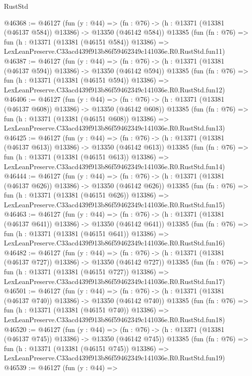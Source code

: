 \begin{lexlean}{RustStd}
\begin{coremodule}
@46368 := @46127
    (fun (y : @44) =>
    (fn : @76) -> (h : @13371 (@13381 (@46137 @584)) @13386) -> @13350 (@46142 @584))
    @13385
    (fun (fn : @76) =>
    fun (h : @13371 (@13381 (@46151 @584)) @13386) =>
    LexLeanPreserve.C33acd439f913b86f59462349c141036e.R0.RustStd.fun11)
@46387 := @46127
    (fun (y : @44) =>
    (fn : @76) -> (h : @13371 (@13381 (@46137 @594)) @13386) -> @13350 (@46142 @594))
    @13385
    (fun (fn : @76) =>
    fun (h : @13371 (@13381 (@46151 @594)) @13386) =>
    LexLeanPreserve.C33acd439f913b86f59462349c141036e.R0.RustStd.fun12)
@46406 := @46127
    (fun (y : @44) =>
    (fn : @76) -> (h : @13371 (@13381 (@46137 @608)) @13386) -> @13350 (@46142 @608))
    @13385
    (fun (fn : @76) =>
    fun (h : @13371 (@13381 (@46151 @608)) @13386) =>
    LexLeanPreserve.C33acd439f913b86f59462349c141036e.R0.RustStd.fun13)
@46425 := @46127
    (fun (y : @44) =>
    (fn : @76) -> (h : @13371 (@13381 (@46137 @613)) @13386) -> @13350 (@46142 @613))
    @13385
    (fun (fn : @76) =>
    fun (h : @13371 (@13381 (@46151 @613)) @13386) =>
    LexLeanPreserve.C33acd439f913b86f59462349c141036e.R0.RustStd.fun14)
@46444 := @46127
    (fun (y : @44) =>
    (fn : @76) -> (h : @13371 (@13381 (@46137 @626)) @13386) -> @13350 (@46142 @626))
    @13385
    (fun (fn : @76) =>
    fun (h : @13371 (@13381 (@46151 @626)) @13386) =>
    LexLeanPreserve.C33acd439f913b86f59462349c141036e.R0.RustStd.fun15)
@46463 := @46127
    (fun (y : @44) =>
    (fn : @76) -> (h : @13371 (@13381 (@46137 @641)) @13386) -> @13350 (@46142 @641))
    @13385
    (fun (fn : @76) =>
    fun (h : @13371 (@13381 (@46151 @641)) @13386) =>
    LexLeanPreserve.C33acd439f913b86f59462349c141036e.R0.RustStd.fun16)
@46482 := @46127
    (fun (y : @44) =>
    (fn : @76) -> (h : @13371 (@13381 (@46137 @727)) @13386) -> @13350 (@46142 @727))
    @13385
    (fun (fn : @76) =>
    fun (h : @13371 (@13381 (@46151 @727)) @13386) =>
    LexLeanPreserve.C33acd439f913b86f59462349c141036e.R0.RustStd.fun17)
@46501 := @46127
    (fun (y : @44) =>
    (fn : @76) -> (h : @13371 (@13381 (@46137 @740)) @13386) -> @13350 (@46142 @740))
    @13385
    (fun (fn : @76) =>
    fun (h : @13371 (@13381 (@46151 @740)) @13386) =>
    LexLeanPreserve.C33acd439f913b86f59462349c141036e.R0.RustStd.fun18)
@46520 := @46127
    (fun (y : @44) =>
    (fn : @76) -> (h : @13371 (@13381 (@46137 @745)) @13386) -> @13350 (@46142 @745))
    @13385
    (fun (fn : @76) =>
    fun (h : @13371 (@13381 (@46151 @745)) @13386) =>
    LexLeanPreserve.C33acd439f913b86f59462349c141036e.R0.RustStd.fun19)
@46539 := @46127
    (fun (y : @44) =>

\end{coremodule}
\end{lexlean}
